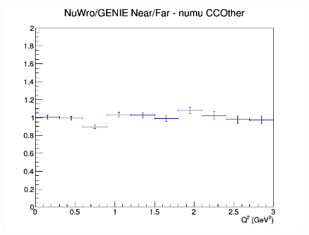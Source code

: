 \begin{figure}[h]
\endminipage
{}
\includegraphics[width=\linewidth]{eff_Q2/GAr/ratios/CCOther_NuWro_GENIE_numu_NF_Q2.png}
\endminipage
\newline
\end{figure}
\clearpage
